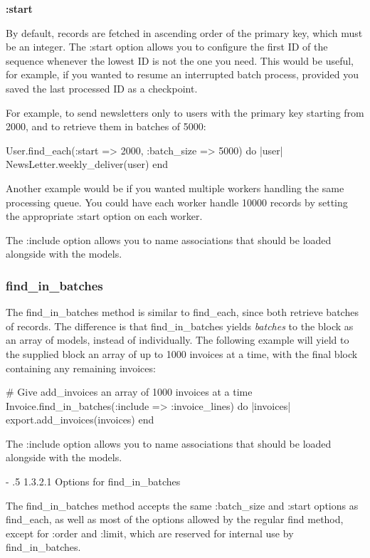 \documentclass[10pt]{book}
\makeatletter
\renewcommand\paragraph{%
   \@startsection{paragraph}{4}{0mm}%
      {-\baselineskip}%
      {.5\baselineskip}%
      {\normalfont\scriptsize\bfseries}}
\newenvironment{code}{%
  \scriptsize
    \verbatim
}{%
    \endverbatim
    \newline
}
\makeatother
\begin{document}
\textbf{:start}

By default, records are fetched in ascending order of the primary key, which must be an integer. The :start  option allows you to configure the first ID of the sequence whenever  the lowest ID is not the one you need. This would be useful, for  example, if you wanted to resume an interrupted batch process, provided  you saved the last processed ID as a checkpoint.

For example, to send newsletters only to users with the primary key starting from 2000, and to retrieve them in batches of 5000:
\begin{code}
User.find_each(:start => 2000, :batch_size => 5000) do |user|
  NewsLetter.weekly_deliver(user)
end
\end{code}

Another example would be if you wanted multiple workers handling the  same processing queue. You could have each worker handle 10000 records  by setting the appropriate :start option on each worker.

The :include option allows you to name associations that should be loaded alongside with the models.

\subsubsection{ find\_in\_batches}

The find\_in\_batches method is similar to find\_each, since both retrieve batches of records. The difference is that find\_in\_batches yields \emph{batches}  to the block as an array of models, instead of individually. The  following example will yield to the supplied block an array of up to  1000 invoices at a time, with the final block containing any remaining  invoices:
\begin{code}
# Give add_invoices an array of 1000 invoices at a time
Invoice.find_in_batches(:include => :invoice_lines) do |invoices|
  export.add_invoices(invoices)
end
\end{code}

The :include option allows you to name associations that should be loaded alongside with the models.

\paragraph{1.3.2.1 Options for find\_in\_batches}

The find\_in\_batches method accepts the same :batch\_size and :start options as find\_each, as well as most of the options allowed by the regular find method, except for :order and :limit, which are reserved for internal use by find\_in\_batches.
\end{document}
